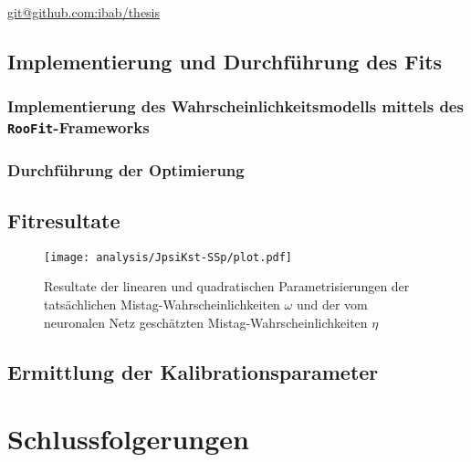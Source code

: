 \url{git@github.com:ibab/thesis}

\subsection{Implementierung und Durchführung des Fits}

\subsubsection{Implementierung des Wahrscheinlichkeitsmodells mittels des \texttt{RooFit}-Frameworks}


\subsubsection{Durchführung der Optimierung}

\subsection{Fitresultate}

\begin{figure}
  \texttt{[image: analysis/JpsiKst-SSp/plot.pdf]}
  \caption{Resultate der linearen und quadratischen Parametrisierungen der tatsächlichen Mistag-Wahrscheinlichkeiten $ω$ und der vom neuronalen Netz geschätzten Mistag-Wahrscheinlichkeiten $η$}
\end{figure}



\subsection{Ermittlung der Kalibrationsparameter}


\section{Schlussfolgerungen}

